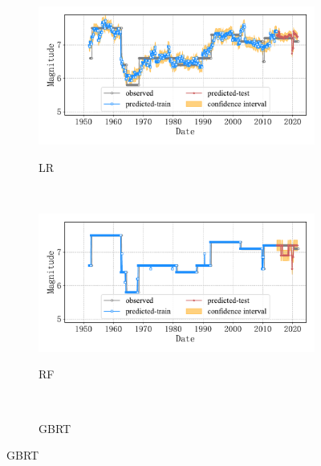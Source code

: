 \begin{figure}[!htbp]
\begin{subfigure}[b]{0.45\textwidth}
      \caption{LR}
      \vspace{-0.2cm}
      \includegraphics[width=\textwidth]{Img/chap5_seism/split90/seism_lr_minyear_1932_maxyear_2021_spanlat_2_spanlon_4_timewindow_120_nextmonth_120_minmag_3.0_split_ratio_0.9_blocks1.pdf}
      \vspace{-1cm}
      \label{fig:seism_lr_minyear_1932_maxyear_2021_spanlat_2_spanlon_4_timewindow_120_nextmonth_120_minmag_3.0_split_ratio_0.9_blocks1}
  \end{subfigure}
  ~
  \begin{subfigure}[b]{0.45\textwidth}
    \caption{RF}
    \vspace{-0.2cm}
    \includegraphics[width=\textwidth]{Img/chap5_seism/split90/seism_rf_minyear_1932_maxyear_2021_spanlat_2_spanlon_4_timewindow_120_nextmonth_120_minmag_3.0_split_ratio_0.9_blocks1.pdf}
    \vspace{-1cm}
    \label{fig:seism_rf_minyear_1932_maxyear_2021_spanlat_2_spanlon_4_timewindow_120_nextmonth_120_minmag_3.0_split_ratio_0.9_blocks1}
  \end{subfigure}
  \\
  \begin{subfigure}[b]{0.45\textwidth}
    \caption{GBRT}
    \vspace{-0.2cm}

\end{subfigure}
\end{figure}
